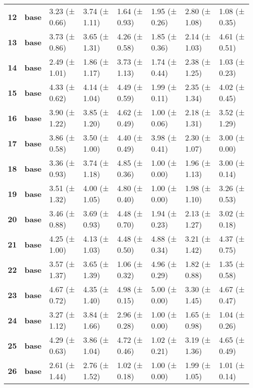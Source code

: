 \begin{longtable}{llllllll}
\cline{1-8}
\textbf{12} & \textbf{base} & 3.23 (± 0.66) & 3.74 (± 1.11) & 1.64 (± 0.93) & 1.95 (± 0.26) & 2.80 (± 1.08) & 1.08 (± 0.35) \\
\cline{1-8}
\textbf{13} & \textbf{base} & 3.73 (± 0.86) & 3.65 (± 1.31) & 4.26 (± 0.58) & 1.85 (± 0.36) & 2.14 (± 1.03) & 4.61 (± 0.51) \\
\cline{1-8}
\textbf{14} & \textbf{base} & 2.49 (± 1.01) & 1.86 (± 1.17) & 3.73 (± 1.13) & 1.74 (± 0.44) & 2.38 (± 1.25) & 1.03 (± 0.23) \\
\cline{1-8}
\textbf{15} & \textbf{base} & 4.33 (± 0.62) & 4.14 (± 1.04) & 4.49 (± 0.59) & 1.99 (± 0.11) & 2.35 (± 1.34) & 4.02 (± 0.45) \\
\cline{1-8}
\textbf{16} & \textbf{base} & 3.90 (± 1.22) & 3.85 (± 1.20) & 4.62 (± 0.49) & 1.00 (± 0.06) & 2.18 (± 1.31) & 3.52 (± 1.29) \\
\cline{1-8}
\textbf{17} & \textbf{base} & 3.86 (± 0.58) & 3.50 (± 1.00) & 4.40 (± 0.49) & 3.98 (± 0.41) & 2.30 (± 1.07) & 3.00 (± 0.00) \\
\cline{1-8}
\textbf{18} & \textbf{base} & 3.36 (± 0.93) & 3.74 (± 1.18) & 4.85 (± 0.36) & 1.00 (± 0.00) & 1.96 (± 1.13) & 3.00 (± 0.14) \\
\cline{1-8}
\textbf{19} & \textbf{base} & 3.51 (± 1.32) & 4.00 (± 1.05) & 4.80 (± 0.40) & 1.00 (± 0.00) & 1.98 (± 1.10) & 3.26 (± 0.53) \\
\cline{1-8}
\textbf{20} & \textbf{base} & 3.46 (± 0.88) & 3.69 (± 0.93) & 4.48 (± 0.70) & 1.94 (± 0.23) & 2.13 (± 1.27) & 3.02 (± 0.18) \\
\cline{1-8}
\textbf{21} & \textbf{base} & 4.25 (± 1.00) & 4.13 (± 1.03) & 4.48 (± 0.50) & 4.88 (± 0.34) & 3.21 (± 1.42) & 4.37 (± 0.75) \\
\cline{1-8}
\textbf{22} & \textbf{base} & 3.57 (± 1.37) & 3.65 (± 1.39) & 1.06 (± 0.32) & 4.96 (± 0.29) & 1.82 (± 0.88) & 1.35 (± 0.58) \\
\cline{1-8}
\textbf{23} & \textbf{base} & 4.67 (± 0.72) & 4.35 (± 1.40) & 4.98 (± 0.15) & 5.00 (± 0.00) & 3.30 (± 1.45) & 4.67 (± 0.47) \\
\cline{1-8}
\textbf{24} & \textbf{base} & 3.27 (± 1.12) & 3.84 (± 1.66) & 2.96 (± 0.28) & 1.00 (± 0.00) & 1.65 (± 0.98) & 1.04 (± 0.26) \\
\cline{1-8}
\textbf{25} & \textbf{base} & 4.29 (± 0.63) & 3.86 (± 1.04) & 4.72 (± 0.46) & 1.02 (± 0.21) & 3.19 (± 1.36) & 4.65 (± 0.49) \\
\cline{1-8}
\textbf{26} & \textbf{base} & 2.61 (± 1.44) & 2.76 (± 1.52) & 1.02 (± 0.18) & 1.00 (± 0.00) & 1.99 (± 1.05) & 1.01 (± 0.14) \\

\end{longtable}
